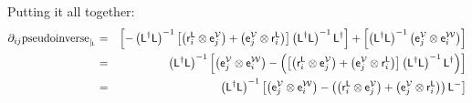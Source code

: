 Putting it all together:
\begin{eqnarray}
{\partial}_{ij}{\mathrm{pseudoinverse}}_{\mid_{\mathsf{L}}}
& = &
\left[
-
\left( \mathsf{L}^{\dagger} \mathsf{L} \right)^{-1}
\left[
\left( \mathsf{r}_i^{\mathsf{L}} \otimes \mathsf{e}_j^{\mathcal{V}} \right)
+
\left( \mathsf{e}_j^{\mathcal{V}} \otimes \mathsf{r}_i^{\mathsf{L}} \right)
\right]
\left( \mathsf{L}^{\dagger} \mathsf{L} \right)^{-1}
\mathsf{L}^{\dagger}
\right]
+
\left[
\left( \mathsf{L}^{\dagger} \mathsf{L} \right)^{-1}
\left( \mathsf{e}_j^{\mathcal{V}} \otimes \mathsf{e}_i^{\mathcal{W}} \right)
\right]
\nonumber
\\
& = &
\left( \mathsf{L}^{\dagger} \mathsf{L} \right)^{-1}
\left[
\left( \mathsf{e}_j^{\mathcal{V}} \otimes \mathsf{e}_i^{\mathcal{W}} \right)
-
\left(
\left[
\left( \mathsf{r}_i^{\mathsf{L}} \otimes \mathsf{e}_j^{\mathcal{V}} \right)
+
\left( \mathsf{e}_j^{\mathcal{V}} \otimes \mathsf{r}_i^{\mathsf{L}} \right)
\right]
\left( \mathsf{L}^{\dagger} \mathsf{L} \right)^{-1}
\mathsf{L}^{\dagger}
\right)
\right]
\nonumber
\\
& = &
\left( \mathsf{L}^{\dagger} \mathsf{L} \right)^{-1}
\left[
\left( \mathsf{e}_j^{\mathcal{V}} \otimes \mathsf{e}_i^{\mathcal{W}} \right)
-
\left(
\left( \mathsf{r}_i^{\mathsf{L}} \otimes \mathsf{e}_j^{\mathcal{V}} \right)
+
\left( \mathsf{e}_j^{\mathcal{V}} \otimes \mathsf{r}_i^{\mathsf{L}} \right)
\right)
\mathsf{L}^{-}
\right]
\end{eqnarray}
